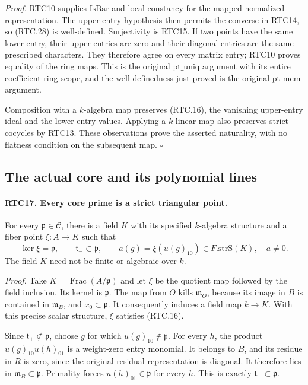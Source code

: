 \documentclass[11pt,a4paper]{article}
\numberwithin{equation}{section}
\theoremstyle{remark}\newtheorem{remark}[theorem]{Remark}
\begin{document}
\emph{Proof.}
RTC10 supplies \(\mathrm{IsBar}\) and local constancy for the
mapped normalized representation.  The upper-entry hypothesis
then permits the converse in RTC14, so (RTC.28) is well-defined.
Surjectivity is RTC15.  If two points have the same lower entry,
their upper entries are zero and their diagonal entries are the
same prescribed characters.  They therefore agree on every matrix
entry; RTC10 proves equality of the ring maps.  This is the
original \(\mathrm{pt\_\allowbreak uniq}\) argument with its entire
coefficient-ring scope, and the well-definedness just proved is
the original \(\mathrm{pt\_\allowbreak mem}\) argument.

Composition with a \(k\)-algebra map preserves (RTC.16), the
vanishing upper-entry ideal and the lower-entry values.  Applying
a \(k\)-linear map also preserves strict cocycles by RTC13.
These observations prove the asserted naturality, with no flatness
condition on the subsequent map. \hfill\(\square\)

\subsection{The actual core and its polynomial lines}

\paragraph{RTC17. Every core prime is a strict triangular point.}
\label{claim:RTC17}
For every \(\mathfrak p\in\mathcal C\), there is a field
\(K\) with its specified \(k\)-algebra structure and a fiber
point \(\xi:A\to K\) such that
\[
 \ker\xi=\mathfrak p,\qquad
 \mathfrak t_-\subset\mathfrak p,\qquad
 a(g)=\xi(u(g)_{10})\in F.\mathrm{strS}(K),\quad a\ne0.
                                                        \tag{RTC.29}
\]
The field \(K\) need not be finite or algebraic over \(k\).

\emph{Proof.}
Take \(K=\operatorname{Frac}(A/\mathfrak p)\) and let
\(\xi\) be the quotient map followed by the field inclusion.
Its kernel is \(\mathfrak p\).  The map from \(O\) kills
\(\mathfrak m_O\), because its image in \(B\) is contained
in \(\mathfrak m_B\), and \(x_0\subset\mathfrak p\).
It consequently induces a field map \(k\to K\).  With this
precise scalar structure, \(\xi\) satisfies (RTC.16).

Since \(\mathfrak t_+\not\subset\mathfrak p\), choose
\(g\) for which \(u(g)_{10}\notin\mathfrak p\).
For every \(h\), the product
\(u(g)_{10}u(h)_{01}\) is a weight-zero entry monomial.
It belongs to \(B\), and its residue in \(R\) is zero,
since the original residual representation is diagonal.
It therefore lies in \(\mathfrak m_B\subset\mathfrak p\).
Primality forces \(u(h)_{01}\in\mathfrak p\) for every
\(h\).  This is exactly \(\mathfrak t_-\subset\mathfrak p\).
\end{document}
